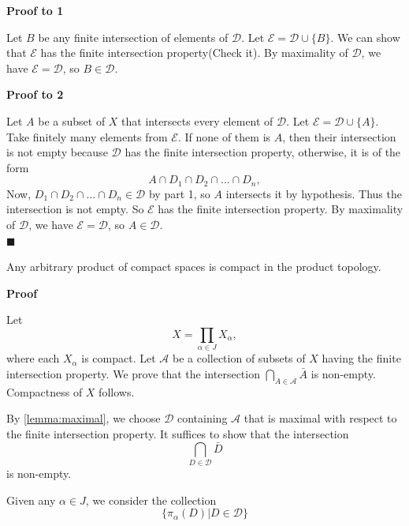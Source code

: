 \documentclass[main.tex]{subfiles}
\begin{document}
\par \noindent \textbf{Proof to 1} 
\par Let $B$ be any finite intersection of elements of $\mathcal{D}$. Let $\mathcal{E} = \mathcal{D} \cup \{B\}$. We can show that $\mathcal{E}$ has the finite intersection property(Check it). By maximality of $\mathcal{D}$, we have $\mathcal{E} = \mathcal{D}$, so $B \in \mathcal{D}$. 
\par \noindent \textbf{Proof to 2} 
\par Let $A$ be a subset of $X$ that intersects every element of $\mathcal{D}$. Let $\mathcal{E} = \mathcal{D} \cup \{A\}$. Take finitely many elements from $\mathcal{E}$. If none of them is $A$, then their intersection is not empty because $\mathcal{D}$ has the finite intersection property, otherwise, it is of the form 
\begin{equation}
    A \cap D_1 \cap D_2 \cap \ldots \cap D_n,
\end{equation}
Now, $D_1 \cap D_2 \cap \ldots \cap D_n \in \mathcal{D}$ by part 1, so $A$ intersects it by hypothesis. Thus the intersection is not empty. So $\mathcal{E}$ has the finite intersection property. By maximality of $\mathcal{D}$, we have $\mathcal{E} = \mathcal{D}$, so $A \in \mathcal{D}$.
\mbox{} \\ \null \hfill $\blacksquare$ 
\begin{theorem}
    Any arbitrary product of compact spaces is compact in the product topology. 
\end{theorem}
\par \noindent \textbf{Proof} 
\par Let  
\begin{equation}
    X = \prod_{\alpha \in J} X_{\alpha},
\end{equation}
where each $X_{\alpha}$ is compact. Let $\mathcal{A}$ be a collection of subsets of $X$ having the finite intersection property. We prove that the intersection $\bigcap_{A \in \mathcal{A}} \bar{A}$
is non-empty. Compactness of $X$ follows. 
\par By \ref{lemma:maximal}, we choose $\mathcal{D}$ containing $\mathcal{A}$ that is maximal with respect to the finite intersection property. It suffices to show that the intersection 
\begin{equation}
    \bigcap_{D \in \mathcal{D}} \bar{D} 
\end{equation}
is non-empty. 
\par Given any $\alpha \in J$, we consider the collection 
\begin{equation}
    \{\pi_{\alpha}(D) | D\in \mathcal{D}\}
\end{equation}
\end{document}
